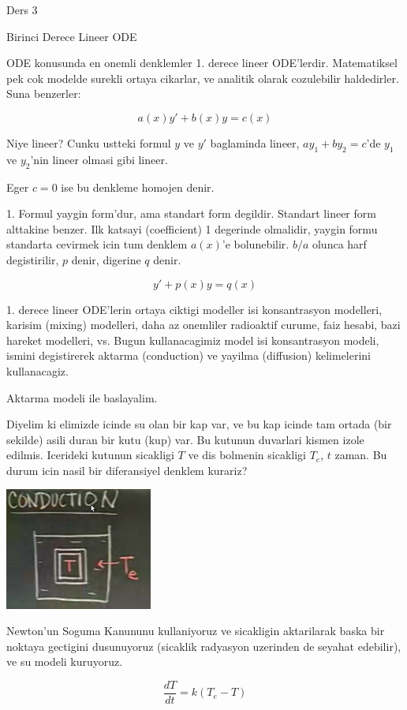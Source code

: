 \documentclass[12pt,fleqn]{article}\usepackage{../common}
\begin{document}
Ders 3

Birinci Derece Lineer ODE

ODE konusunda en onemli denklemler 1. derece lineer
ODE'lerdir. Matematiksel pek cok modelde surekli ortaya cikarlar, ve
analitik olarak cozulebilir haldedirler. Suna benzerler:

\[ a(x)y' + b(x)y = c(x) \]

Niye lineer? Cunku ustteki formul $y$ ve $y'$ baglaminda lineer, 
$ay_1 + by_2 = c$'de $y_1$ ve $y_2$'nin lineer olmasi gibi lineer.

Eger $c = 0$ ise bu denkleme homojen denir. 

1. Formul yaygin form'dur, ama standart form degildir. Standart lineer form alttakine
benzer. Ilk katsayi (coefficient) 1 degerinde olmalidir, yaygin formu standarta
cevirmek icin tum denklem $a(x)$'e bolunebilir. $b/a$ olunca harf degistirilir,
$p$ denir, digerine $q$ denir.

\[ y' + p(x)y = q(x) \]

1. derece lineer ODE'lerin ortaya ciktigi modeller isi konsantrasyon modelleri,
karisim (mixing) modelleri, daha az onemliler radioaktif curume, faiz hesabi,
bazi hareket modelleri, vs. Bugun kullanacagimiz model isi konsantrasyon
modeli, ismini degistirerek aktarma (conduction) ve yayilma (diffusion)
kelimelerini kullanacagiz. 

Aktarma modeli ile baslayalim. 

Diyelim ki elimizde icinde su olan bir kap var, ve bu kap icinde tam
ortada (bir sekilde) asili duran bir kutu (kup) var. Bu kutunun
duvarlari kismen izole edilmis. Icerideki kutunun sicakligi $T$ ve dis
bolmenin sicakligi $T_e$, $t$ zaman. Bu durum icin nasil bir
diferansiyel denklem kurariz?

\includegraphics[height=4cm]{3_1.png}

Newton'un Soguma Kanununu kullaniyoruz ve sicakligin aktarilarak baska
bir noktaya gectigini dusunuyoruz (sicaklik radyasyon uzerinden de
seyahat edebilir), ve su modeli kuruyoruz. 

\[ \frac{dT}{dt} = k(T_e - T) \]
\end{document}
